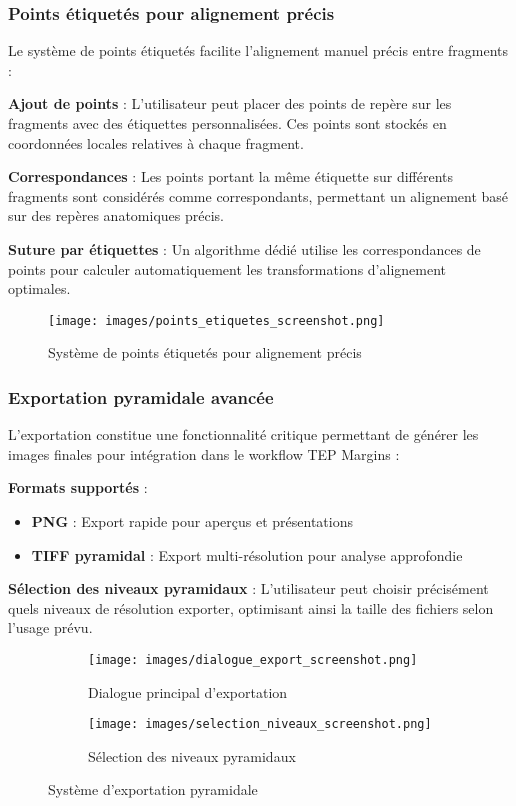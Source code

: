 \documentclass[12pt,a4paper]{report}
\begin{document}
\begin{}
\begin{}
\begin{}
\begin{}
\subsubsection{Points étiquetés pour alignement précis}

Le système de points étiquetés facilite l'alignement manuel précis entre fragments :

\textbf{Ajout de points} : L'utilisateur peut placer des points de repère sur les fragments avec des étiquettes personnalisées. Ces points sont stockés en coordonnées locales relatives à chaque fragment.

\textbf{Correspondances} : Les points portant la même étiquette sur différents fragments sont considérés comme correspondants, permettant un alignement basé sur des repères anatomiques précis.

\textbf{Suture par étiquettes} : Un algorithme dédié utilise les correspondances de points pour calculer automatiquement les transformations d'alignement optimales.

\begin{figure}[H]
\centering
\texttt{[image: images/points\_etiquetes\_screenshot.png]}
\caption{Système de points étiquetés pour alignement précis}
\label{fig:points_etiquetes}
\end{figure}

\subsubsection{Exportation pyramidale avancée}

L'exportation constitue une fonctionnalité critique permettant de générer les images finales pour intégration dans le workflow TEP Margins :

\textbf{Formats supportés} :
\begin{itemize}
\item \textbf{PNG} : Export rapide pour aperçus et présentations
\item \textbf{TIFF pyramidal} : Export multi-résolution pour analyse approfondie
\end{itemize}

\textbf{Sélection des niveaux pyramidaux} : L'utilisateur peut choisir précisément quels niveaux de résolution exporter, optimisant ainsi la taille des fichiers selon l'usage prévu.

\begin{figure}[H]
\centering
\begin{subfigure}{0.48\textwidth}
\texttt{[image: images/dialogue\_export\_screenshot.png]}
\caption{Dialogue principal d'exportation}
\end{subfigure}
\hfill
\begin{subfigure}{0.48\textwidth}
\texttt{[image: images/selection\_niveaux\_screenshot.png]}
\caption{Sélection des niveaux pyramidaux}
\end{subfigure}
\caption{Système d'exportation pyramidale}
\label{fig:export_pyramidal}
\end{figure}


\end{}
\end{}
\end{}
\end{}
\end{document}
